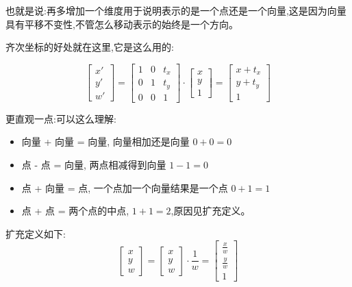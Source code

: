 \documentclass[UTF8]{ctexbook}
\begin{document}
{{{{        也就是说:再多增加一个维度用于说明表示的是一个点还是一个向量,这是因为向量具有平移不变性,不管怎么移动表示的始终是一个方向。

        齐次坐标的好处就在这里,它是这么用的:

        $$\left[\begin{array}{c}
              x\prime \\
              y\prime \\
              w\prime
            \end{array}\right]
          =
          \left[\begin{matrix}
              1 & 0 & t_x \\
              0 & 1 & t_y \\
              0 & 0 & 1
            \end{matrix}\right]
          \cdot
          \left[\begin{array}{c}
              x \\
              y \\
              1
            \end{array}\right]
          =
          \left[\begin{array}{c}
              x + t_x \\
              y + t_y \\
              1
            \end{array}\right]
        $$

        更直观一点:可以这么理解:
        \begin{itemize}
          \item 向量 + 向量 = 向量, 向量相加还是向量 $0 + 0 = 0$
          \item 点 - 点 = 向量, 两点相减得到向量 $1 - 1 = 0$
          \item 点 + 向量 = 点, 一个点加一个向量结果是一个点 $0 + 1 = 1$
          \item 点 + 点 = 两个点的中点, $1 + 1 = 2$,原因见扩充定义。
        \end{itemize}
        扩充定义如下:
        $$\left[\begin{array}{c}
              x \\
              y \\
              w
            \end{array}\right] = \left[\begin{array}{c}
              x \\
              y \\
              w
            \end{array}\right]\cdot\frac{1}{w} = \left[\begin{array}{c}
              \frac{x}{w} \\
              \frac{y}{w} \\
              1
            \end{array}\right]$$

}}}}
\end{document}
